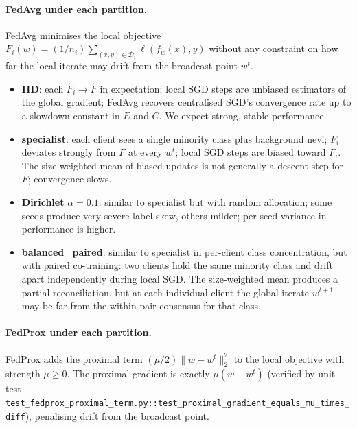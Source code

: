 \paragraph{FedAvg under each partition.}
FedAvg \citep{mcmahan2017fedavg} minimises the local objective
$F_i(w) = (1/n_i) \sum_{(x,y)\in\mathcal{D}_i} \ell(f_w(x), y)$
without any constraint on how far the local iterate may drift from
the broadcast point $w^t$.

\begin{itemize}
  \item \textbf{IID}: each $F_i \to F$ in expectation; local SGD
        steps are unbiased estimators of the global gradient; FedAvg
        recovers centralised SGD's convergence rate up to a slowdown
        constant in $E$ and $C$. We expect strong, stable performance.
  \item \textbf{specialist}: each client sees a single minority class
        plus background nevi; $F_i$ deviates strongly from $F$ at
        every $w^t$; local SGD steps are biased toward $F_i$. The
        size-weighted mean of biased updates is not generally a
        descent step for $F$; convergence slows.
  \item \textbf{Dirichlet} $\alpha=0.1$: similar to specialist but
        with random allocation; some seeds produce very severe label
        skew, others milder; per-seed variance in performance is
        higher.
  \item \textbf{balanced\_paired}: similar to specialist in
        per-client class concentration, but with paired co-training:
        two clients hold the same minority class and drift apart
        independently during local SGD. The size-weighted mean
        produces a partial reconciliation, but at each individual
        client the global iterate $w^{t+1}$ may be far from the
        within-pair consensus for that class.
\end{itemize}

\paragraph{FedProx under each partition.}
FedProx \citep{li2020fedprox} adds the proximal term
$(\mu/2)\lVert w - w^t \rVert_2^2$ to the local objective with
strength $\mu \geq 0$. The proximal gradient is exactly $\mu(w - w^t)$
(verified by unit test
\texttt{test\_fedprox\_proximal\_term.py::test\_proximal\_gradient\_equals\_mu\_times\_diff}),
penalising drift from the broadcast point.

